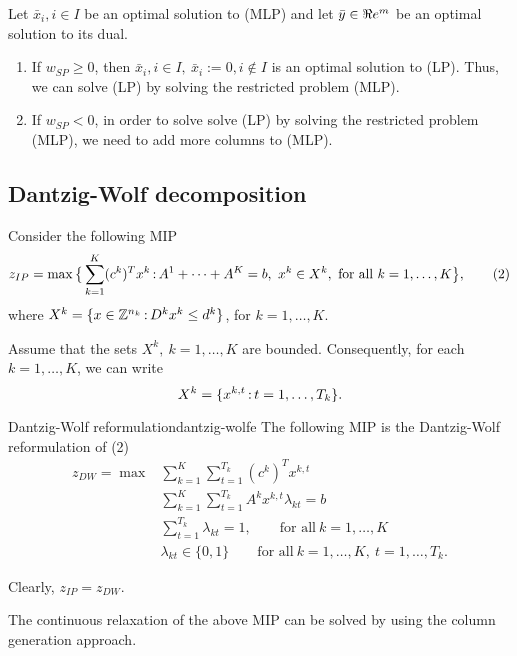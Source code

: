 \begin{theorem}{}{} Let $\bar x_i,i\in I$ be an optimal solution to (MLP) and let $\bar y\in\Re e^m$ be an optimal solution to its dual.
\begin{enumerate}
\item  If $w_{SP}\geq 0$, then $\bar x_i,i\in I,\ \bar x_i:=0,i\notin I$ is an optimal solution to (LP). Thus, we can solve (LP) by solving the restricted problem (MLP).
\item  If $w_{SP}< 0$, in order to solve solve (LP) by solving the restricted problem (MLP), we need to add more columns to (MLP).
\end{enumerate}
\end{theorem}


\subsection{Dantzig-Wolf decomposition}

Consider the following MIP
$$z_{IP}=\max \big\{\sum_{k=1}^K(c^k)^Tx^k{\,:\,} A^1+\dots+A^K=b,\ x^k\in X^k,\ \mbox{for all}\ k=1,\dots,K\big\},\qquad (2)$$
where $X^k=\{x\in{\mathbb{Z}}^{n_k}{\,:\,} D^kx^k\leq d^k\}$, for $k=1,\dots,K$.

Assume that the sets $X^k,\ k=1,\dots,K$ are bounded. Consequently, for each $k=1,\dots,K$, we can write 
$$X^k=\{x^{k,t}{\,:\,} t=1,\dots, T_k\}.$$

\begin{definition}{Dantzig-Wolf reformulation}{dantzig-wolfe} The following MIP is the Dantzig-Wolf reformulation of (2)
\begin{align*}
z_{DW}= \max &\sum_{k=1}^K\sum_{t=1}^{T_k}(c^k)^Tx^{k,t}\\
&\sum_{k=1}^K\sum_{t=1}^{T_k}A^kx^{k,t}\lambda_{kt}=b\\
&\sum_{t=1}^{T_k}\lambda_{kt}=1,\qquad \text{for all}\ k=1,\dots,K\\
& \lambda_{kt}\in\{0,1\}\qquad \text{for all}\ k=1,\dots,K,\ t=1,\dots, T_k. 
\end{align*}
\end{definition}
\begin{remark}{}{}
Clearly, $z_{IP}=z_{DW}$.
\end{remark}

The continuous relaxation of the above MIP can be solved by using the column generation approach.



